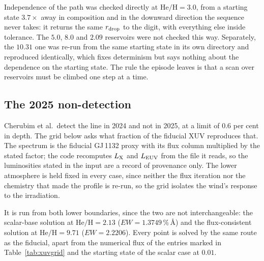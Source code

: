 \documentclass[english,a4paper]{my_memo}
\begin{document}
\medskip
\noindent Independence of the path was checked directly at
$\mathrm{He/H} = 3.0$, from a starting state $3.7\times$ away in composition
and in the downward direction the sequence never takes: it returns the same
$r_{\rm drop}$ to the digit, with everything else inside tolerance. The
$5.0$, $8.0$ and $2.09$ reservoirs were not checked this way. Separately, the
$10.31$ one was re-run from the same starting state in its own directory and
reproduced identically, which fixes determinism but says nothing about the
dependence on the starting state. The rule the episode leaves is that a scan
over reservoirs must be climbed one step at a time.

\subsection{The 2025 non-detection}
\label{sec:xuvgrid}

Cherubim et al.\ detect the line in 2024 and not in 2025, at a limit of $0.6$
per cent in depth. The grid below asks what fraction of the fiducial XUV
reproduces that. The spectrum is the fiducial GJ\,1132 proxy with its flux
column multiplied by the stated factor; the code recomputes $L_{\rm X}$ and
$L_{\rm EUV}$ from the file it reads, so the luminosities stated in the input
are a record of provenance only. The lower atmosphere is held fixed in every
case, since neither the flux iteration nor the chemistry that made the
profile is re-run, so the grid isolates the wind's response to the
irradiation.

It is run from both lower boundaries, since the two are not interchangeable:
the scalar-base solution at $\mathrm{He/H} = 2.13$ ($EW = 1.3749$\,\%\,\AA)
and the flux-consistent solution at $\mathrm{He/H} = 9.71$ ($EW = 2.2206$).
Every point is solved by the same route as the fiducial, apart from the
numerical flux of the entries marked in Table~\ref{tab:xuvgrid} and the
starting state of the scalar case at $0.01$.
\end{document}
